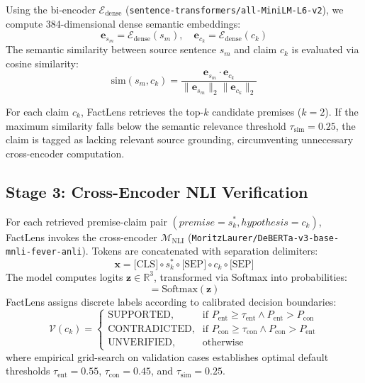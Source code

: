 \documentclass[conference]{IEEEtran}
\begin{document}
Using the bi-encoder $\mathcal{E}_{\text{dense}}$ (\texttt{sentence-transformers/all-MiniLM-L6-v2}), we compute 384-dimensional dense semantic embeddings:
\begin{equation}
\mathbf{e}_{s_m} = \mathcal{E}_{\text{dense}}(s_m), \quad \mathbf{e}_{c_k} = \mathcal{E}_{\text{dense}}(c_k)
\end{equation}
The semantic similarity between source sentence $s_m$ and claim $c_k$ is evaluated via cosine similarity:
\begin{equation}
\text{sim}(s_m, c_k) = \frac{\mathbf{e}_{s_m} \cdot \mathbf{e}_{c_k}}{\|\mathbf{e}_{s_m}\|_2 \|\mathbf{e}_{c_k}\|_2}
\end{equation}

For each claim $c_k$, FactLens retrieves the top-$k$ candidate premises ($k=2$). If the maximum similarity falls below the semantic relevance threshold $\tau_{\text{sim}} = 0.25$, the claim is tagged as lacking relevant source grounding, circumventing unnecessary cross-encoder computation.

\subsection{Stage 3: Cross-Encoder NLI Verification}
For each retrieved premise-claim pair $(premise=s^*_k, hypothesis=c_k)$, FactLens invokes the cross-encoder $\mathcal{M}_{\text{NLI}}$ (\texttt{MoritzLaurer/DeBERTa-v3-base-mnli-fever-anli}). Tokens are concatenated with separation delimiters:
\begin{equation}
\mathbf{x} = \text{[CLS]} \circ s^*_k \circ \text{[SEP]} \circ c_k \circ \text{[SEP]}
\end{equation}
The model computes logits $\mathbf{z} \in \mathbb{R}^3$, transformed via Softmax into probabilities:
\begin{equation}
[P_{\text{ent}}, P_{\text{neu}}, P_{\text{con}}] = \text{Softmax}(\mathbf{z})
\end{equation}
FactLens assigns discrete labels according to calibrated decision boundaries:
\begin{equation}
\mathcal{V}(c_k) = 
\begin{cases} 
\text{SUPPORTED}, & \text{if } P_{\text{ent}} \ge \tau_{\text{ent}} \land P_{\text{ent}} > P_{\text{con}} \\
\text{CONTRADICTED}, & \text{if } P_{\text{con}} \ge \tau_{\text{con}} \land P_{\text{con}} > P_{\text{ent}} \\
\text{UNVERIFIED}, & \text{otherwise}
\end{cases}
\end{equation}
where empirical grid-search on validation cases establishes optimal default thresholds $\tau_{\text{ent}} = 0.55$, $\tau_{\text{con}} = 0.45$, and $\tau_{\text{sim}} = 0.25$.
\end{document}
